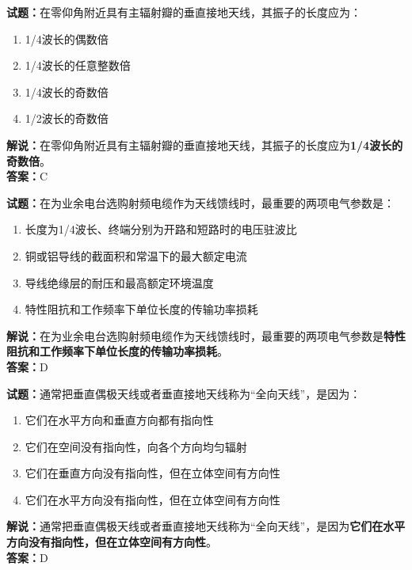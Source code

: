 \documentclass{ctexbook}
\begin{document}
\noindent\textbf{试题：}在零仰角附近具有主辐射瓣的垂直接地天线，其振子的长度应为：

\begin{enumerate}[leftmargin=3em]
  \item 1/4波长的偶数倍
  \item 1/4波长的任意整数倍
  \item 1/4波长的奇数倍
  \item 1/2波长的奇数倍
\end{enumerate}

\noindent\textbf{解说：}在零仰角附近具有主辐射瓣的垂直接地天线，其振子的长度应为\textbf{1/4波长的奇数倍}。\\\noindent\textbf{答案：}C%

\vspace{\baselineskip}

\noindent\textbf{试题：}在为业余电台选购射频电缆作为天线馈线时，最重要的两项电气参数是：

\begin{enumerate}[leftmargin=3em]
  \item 长度为1/4波长、终端分别为开路和短路时的电压驻波比
  \item 铜或铝导线的截面积和常温下的最大额定电流
  \item 导线绝缘层的耐压和最高额定环境温度
  \item 特性阻抗和工作频率下单位长度的传输功率损耗
\end{enumerate}

\noindent\textbf{解说：}在为业余电台选购射频电缆作为天线馈线时，最重要的两项电气参数是\textbf{特性阻抗和工作频率下单位长度的传输功率损耗}。\\\noindent\textbf{答案：}D%

\vspace{\baselineskip}

\noindent\textbf{试题：}通常把垂直偶极天线或者垂直接地天线称为“全向天线”，是因为：

\begin{enumerate}[leftmargin=3em]
  \item 它们在水平方向和垂直方向都有指向性
  \item 它们在空间没有指向性，向各个方向均匀辐射
  \item 它们在垂直方向没有指向性，但在立体空间有方向性
  \item 它们在水平方向没有指向性，但在立体空间有方向性
\end{enumerate}

\noindent\textbf{解说：}通常把垂直偶极天线或者垂直接地天线称为“全向天线”，是因为\textbf{它们在水平方向没有指向性，但在立体空间有方向性}。\\\noindent\textbf{答案：}D%
\end{document}
